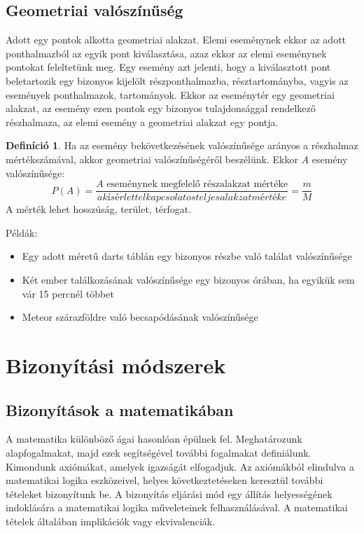 \documentclass[twoside,12pt]{report}
\theoremstyle{definition}
\newtheorem{definition}[theorem]{Definíció}
\begin{document}
\section{Geometriai valószínűség}
	Adott egy pontok alkotta geometriai alakzat. Elemi eseménynek ekkor az adott ponthalmazból az
	egyik pont kiválasztása, azaz ekkor az elemi eseménynek pontokat feleltetünk meg. Egy esemény
	azt jelenti, hogy a kiválasztott pont beletartozik egy bizonyos kijelölt részponthalmazba, résztartományba, vagyis az események ponthalmazok, tartományok. Ekkor az eseménytér egy geometriai
	alakzat, az esemény ezen pontok egy bizonyos tulajdonsággal rendelkező részhalmaza, az elemi
	esemény a geometriai alakzat egy pontja.
	\begin{definition}
		Ha az esemény bekövetkezésének valószínűsége arányos a részhalmaz mértékszámával,
		akkor geometriai valószínűségéről beszélünk. Ekkor $A$ esemény valószínűsége:
		\begin{equation*}
			P(A)=\frac{\text{$A$ eseménynek megfelelő részalakzat mértéke}}{a kísérlettel kapcsolatos teljes alakzat mértéke}=\frac{m}{M}
		\end{equation*}
		A mérték lehet hosszúság, terület, térfogat.
	\end{definition}
	Példák:
	\begin{itemize}
		\item Egy adott méretű darts táblán egy bizonyos részbe való találat valószínűsége
		\item Két ember találkozásának valószínűsége egy bizonyos órában, ha egyikük sem vár 15 percnél
		többet
		\item Meteor szárazföldre való becsapódásának valószínűsége
	\end{itemize}
\chapter{Bizonyítási módszerek}
\section{Bizonyítások a matematikában}
	A matematika különböző ágai hasonlóan épülnek fel. Meghatározunk alapfogalmakat, majd ezek	segítségével további fogalmakat definiálunk. Kimondunk axiómákat, amelyek igazságát elfogadjuk. Az axiómákból elindulva a matematikai logika eszközeivel, helyes következtetéseken keresztül további tételeket bizonyítunk be. A bizonyítás eljárási mód egy állítás helyességének indoklására a matematikai logika műveleteinek felhasználásával. A matematikai tételek általában implikációk vagy ekvivalenciák.
	
\end{document}
